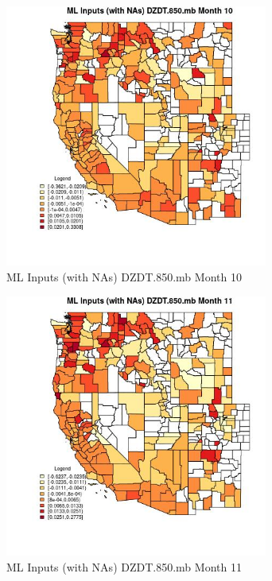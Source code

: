 \begin{figure} 
\centering  
\includegraphics[width=0.77\textwidth]{Code_Outputs/Report_ML_input_PM25_Step4_part_f_de_duplicated_aves_prioritize_24hr_obswNAs_CountyDZDT850mbmedianMonth10.jpg} 
\caption{\label{fig:Report_ML_input_PM25_Step4_part_f_de_duplicated_aves_prioritize_24hr_obswNAsCountyDZDT850mbmedianMonth10}ML Inputs (with NAs) DZDT.850.mb Month 10} 
\end{figure} 
 

\begin{figure} 
\centering  
\includegraphics[width=0.77\textwidth]{Code_Outputs/Report_ML_input_PM25_Step4_part_f_de_duplicated_aves_prioritize_24hr_obswNAs_CountyDZDT850mbmedianMonth11.jpg} 
\caption{\label{fig:Report_ML_input_PM25_Step4_part_f_de_duplicated_aves_prioritize_24hr_obswNAsCountyDZDT850mbmedianMonth11}ML Inputs (with NAs) DZDT.850.mb Month 11} 
\end{figure} 
 

